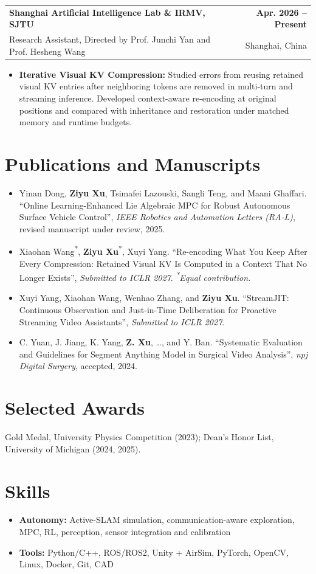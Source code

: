 \documentclass[11pt,letterpaper]{article}
\makeatletter
\newcommand{\resumeSubheading}[4]{
    \begin{tabularx}{\textwidth}{@{}Xr@{}}
        \textbf{#1} & \textbf{#2} \\
        #3 & #4 \\
    \end{tabularx}
}
\newcommand{\resumeItem}[1]{
    \item #1
}
\makeatother
\begin{document}
\resumeSubheading
{Shanghai Artificial Intelligence Lab \& IRMV, SJTU }
{Apr. 2026 -- Present}
{\hspace*{1.4em}Research Assistant, Directed by Prof. Junchi Yan and Prof. Hesheng Wang}
{Shanghai, China}
\begin{itemize}[leftmargin=2.4em, itemsep=0.5pt, topsep=0pt]
\small
\resumeItem{\textbf{Iterative Visual KV Compression:} Studied errors from reusing retained visual KV entries after neighboring tokens are removed in multi-turn and streaming inference. Developed context-aware re-encoding at original positions and compared with inheritance and restoration under matched memory and runtime budgets.}
\end{itemize}

\section*{Publications and Manuscripts}
\begin{itemize}[leftmargin=1.4em,itemsep=3pt,topsep=2pt]
\small
\item Yinan Dong, \textbf{Ziyu Xu}, Tsimafei Lazouski, Sangli Teng, and Maani Ghaffari.      ``Online Learning-Enhanced Lie Algebraic MPC for Robust Autonomous Surface Vehicle Control'',      \textit{IEEE Robotics and Automation Letters (RA-L)}, revised manuscript under review, 2025.
\item Xiaohan Wang\textsuperscript{*}, \textbf{Ziyu Xu}\textsuperscript{*}, Xuyi Yang.      ``Re-encoding What You Keep After Every Compression: Retained Visual KV Is Computed in a Context That No Longer Exists'',      \textit{Submitted to ICLR 2027}. \textit{\textsuperscript{*}Equal contribution.}
\item Xuyi Yang, Xiaohan Wang, Wenhao Zhang, and \textbf{Ziyu Xu}.      ``StreamJIT: Continuous Observation and Just-in-Time Deliberation for Proactive Streaming Video Assistants'',      \textit{Submitted to ICLR 2027}.
\item C. Yuan, J. Jiang, K. Yang, \textbf{Z. Xu}, \ldots, and Y. Ban.      ``Systematic Evaluation and Guidelines for Segment Anything Model in Surgical Video Analysis'',      \textit{npj Digital Surgery}, accepted, 2024.
\end{itemize}
\section*{Selected Awards}
\small Gold Medal, University Physics Competition (2023); Dean's Honor List, University of Michigan (2024, 2025).
\section*{Skills}
\begin{itemize}[leftmargin=2.4em, itemsep=0.5pt, topsep=0pt]
\small
\resumeItem{\textbf{Autonomy:} Active-SLAM simulation, communication-aware exploration, MPC, RL, perception, sensor integration and calibration}
\resumeItem{\textbf{Tools:} Python/C++, ROS/ROS2, Unity + AirSim, PyTorch, OpenCV, Linux, Docker, Git, CAD}
\end{itemize}
\end{document}
